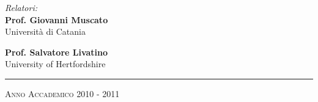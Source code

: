 \begin{titlepage}
\begin{flushright}
  \vfill
  \textsf{\textit{Relatori:}} \\
  \textsf{\textbf{Prof. Giovanni Muscato}} \\                      
  \textsf{Universit\`a di Catania} \\                      
  \vspace{0.5 truecm}
  
  \textsf{\textbf{Prof. Salvatore Livatino }} \\
  \textsf{University of Hertfordshire} \\                      


\end{flushright}

\rule{\linewidth}{1pt}
\begin{center}

\large\textsc{Anno Accademico 2010 - 2011}

\end{center}


\end{titlepage}
